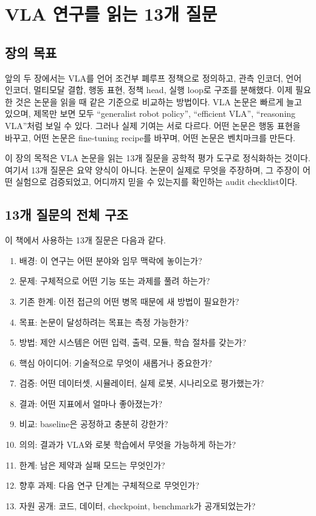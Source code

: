 \chapter{VLA 연구를 읽는 13개 질문}

\section{장의 목표}

앞의 두 장에서는 VLA를 언어 조건부 폐루프 정책으로 정의하고, 관측 인코더, 언어 인코더, 멀티모달 결합, 행동 표현, 정책 head, 실행 loop로 구조를 분해했다. 이제 필요한 것은 논문을 읽을 때 같은 기준으로 비교하는 방법이다. VLA 논문은 빠르게 늘고 있으며, 제목만 보면 모두 ``generalist robot policy'', ``efficient VLA'', ``reasoning VLA''처럼 보일 수 있다. 그러나 실제 기여는 서로 다르다. 어떤 논문은 행동 표현을 바꾸고, 어떤 논문은 fine-tuning recipe를 바꾸며, 어떤 논문은 벤치마크를 만든다.

이 장의 목적은 VLA 논문을 읽는 13개 질문을 공학적 평가 도구로 정식화하는 것이다. 여기서 13개 질문은 요약 양식이 아니다. 논문이 실제로 무엇을 주장하며, 그 주장이 어떤 실험으로 검증되었고, 어디까지 믿을 수 있는지를 확인하는 audit checklist이다.

\section{13개 질문의 전체 구조}

이 책에서 사용하는 13개 질문은 다음과 같다.

\begin{enumerate}
  \item 배경: 이 연구는 어떤 분야와 임무 맥락에 놓이는가?
  \item 문제: 구체적으로 어떤 기능 또는 과제를 풀려 하는가?
  \item 기존 한계: 이전 접근의 어떤 병목 때문에 새 방법이 필요한가?
  \item 목표: 논문이 달성하려는 목표는 측정 가능한가?
  \item 방법: 제안 시스템은 어떤 입력, 출력, 모듈, 학습 절차를 갖는가?
  \item 핵심 아이디어: 기술적으로 무엇이 새롭거나 중요한가?
  \item 검증: 어떤 데이터셋, 시뮬레이터, 실제 로봇, 시나리오로 평가했는가?
  \item 결과: 어떤 지표에서 얼마나 좋아졌는가?
  \item 비교: baseline은 공정하고 충분히 강한가?
  \item 의의: 결과가 VLA와 로봇 학습에서 무엇을 가능하게 하는가?
  \item 한계: 남은 제약과 실패 모드는 무엇인가?
  \item 향후 과제: 다음 연구 단계는 구체적으로 무엇인가?
  \item 자원 공개: 코드, 데이터, checkpoint, benchmark가 공개되었는가?
\end{enumerate}

